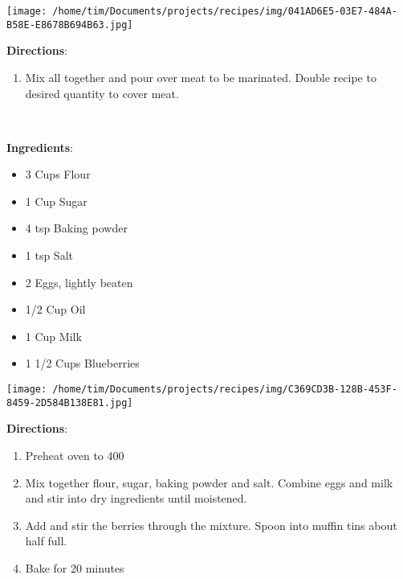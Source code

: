 \documentclass[11pt, twoside, openany]{book}
\begin{document}
\begin{minipage}[t]{0.2\linewidth}
\centering \strut\vspace*{-\baselineskip}\newline
\texttt{[image: /home/tim/Documents/projects/recipes/img/041AD6E5-03E7-484A-B58E-E8678B694B63.jpg]}\\
\end{minipage}\vspace{3mm}
\textbf{Directions}:
\vspace{-3mm}\begin{enumerate}\setlength\itemsep{-1mm}
\item Mix all together and pour over meat to be marinated. Double recipe to desired quantity to cover meat.
\end{enumerate}
 \label{blueberry-muffins}\hfill\textit{}\\
\begin{minipage}[t]{0.8\linewidth}
\textbf{Ingredients}:\vspace{-3mm}
\begin{multicols}{2}
\begin{itemize}\setlength\itemsep{-1mm}
\item 3 Cups Flour
\item 1 Cup Sugar
\item 4 tsp Baking powder
\item 1 tsp Salt
\item 2 Eggs, lightly beaten
\item 1/2 Cup Oil
\item 1 Cup Milk
\item 1 1/2 Cups Blueberries
\end{itemize}
\end{multicols}
\end{minipage}
\begin{minipage}[t]{0.2\linewidth}
\centering \strut\vspace*{-\baselineskip}\newline
\texttt{[image: /home/tim/Documents/projects/recipes/img/C369CD3B-128B-453F-8459-2D584B138E81.jpg]}\\
\end{minipage}\vspace{3mm}
\textbf{Directions}:
\vspace{-3mm}\begin{enumerate}\setlength\itemsep{-1mm}
\item Preheat oven to 400
\item Mix together flour, sugar, baking powder and salt. Combine eggs and milk and stir into dry ingredients until moistened.
\item Add and stir the berries through the mixture. Spoon into muffin tins about half full.
\item Bake for 20 minutes
\end{enumerate}
\end{document}
